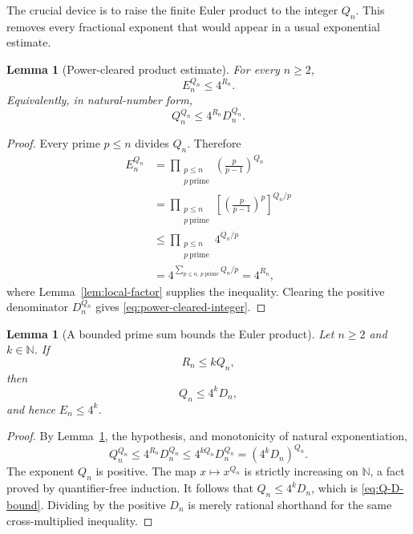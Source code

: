 \documentclass[11pt]{article}
\newtheorem{lemma}[theorem]{Lemma}
\theoremstyle{definition}
\newcommand{\N}{\mathbb{N}}
\newcommand{\ProdP}{Q}
\newcommand{\NumP}{R}
\newcommand{\DenE}{D}
\begin{document}
The crucial device is to raise the finite Euler product to the integer
\(\ProdP_n\).  This removes every fractional exponent that would appear in a
usual exponential estimate.

\begin{lemma}[Power-cleared product estimate]\label{lem:power-cleared}
For every \(n\geq2\),
\begin{equation}\label{eq:power-cleared-rational}
  E_n^{\ProdP_n}\leq4^{\NumP_n}.
\end{equation}
Equivalently, in natural-number form,
\begin{equation}\label{eq:power-cleared-integer}
  \ProdP_n^{\ProdP_n}
  \leq 4^{\NumP_n}\DenE_n^{\ProdP_n}.
\end{equation}
\end{lemma}

\begin{proof}
Every prime \(p\leq n\) divides \(\ProdP_n\).  Therefore
\begin{align*}
 E_n^{\ProdP_n}
 &=\prod_{\substack{p\leq n\\p\ \mathrm{prime}}}
      \left(\frac{p}{p-1}\right)^{\ProdP_n}\\
 &=\prod_{\substack{p\leq n\\p\ \mathrm{prime}}}
      \left[\left(\frac{p}{p-1}\right)^p\right]^{\ProdP_n/p}\\
 &\leq\prod_{\substack{p\leq n\\p\ \mathrm{prime}}}
      4^{\ProdP_n/p}\\
 &=4^{\sum_{p\leq n,\,p\ \mathrm{prime}}\ProdP_n/p}
 =4^{\NumP_n},
\end{align*}
where Lemma~\ref{lem:local-factor} supplies the inequality.  Clearing the
positive denominator \(\DenE_n^{\ProdP_n}\) gives
\eqref{eq:power-cleared-integer}.
\end{proof}

\begin{lemma}[A bounded prime sum bounds the Euler product]\label{lem:sum-bounds-product}
Let \(n\geq2\) and \(k\in\N\).  If
\[
  \NumP_n\leq k\ProdP_n,
\]
then
\begin{equation}\label{eq:Q-D-bound}
  \ProdP_n\leq4^k\DenE_n,
\end{equation}
and hence \(E_n\leq4^k\).
\end{lemma}

\begin{proof}
By Lemma~\ref{lem:power-cleared}, the hypothesis, and monotonicity of natural
exponentiation,
\[
 \ProdP_n^{\ProdP_n}
 \leq4^{\NumP_n}\DenE_n^{\ProdP_n}
 \leq4^{k\ProdP_n}\DenE_n^{\ProdP_n}
 =(4^k\DenE_n)^{\ProdP_n}.
\]
The exponent \(\ProdP_n\) is positive.  The map \(x\mapsto x^{\ProdP_n}\)
is strictly increasing on \(\N\), a fact proved by quantifier-free induction.
It follows that \(\ProdP_n\leq4^k\DenE_n\), which is
\eqref{eq:Q-D-bound}.  Dividing by the positive \(\DenE_n\) is merely
rational shorthand for the same cross-multiplied inequality.
\end{proof}
\end{document}
